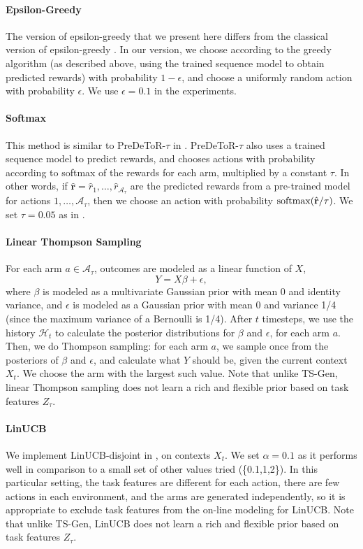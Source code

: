 \paragraph{Epsilon-Greedy}
The version of epsilon-greedy that we present here differs from the classical version of epsilon-greedy \citep{sutton2018reinforcement}. In our version, we choose according to the greedy algorithm (as described above, using the trained sequence model to obtain predicted rewards) with probability $1-\epsilon$, and choose a uniformly random action with probability $\epsilon$. We use $\epsilon=0.1$ in the experiments. 

\paragraph{Softmax}
This method is similar to PreDeToR-$\tau$ in \citet{mukherjee2024pretraining}. PreDeToR-$\tau$ also uses a trained sequence model to predict rewards, and chooses actions with probability 
according to softmax of the rewards for each arm, multiplied by a constant $\tau$. 
In other words, if $\hat {\textbf {r}}=\hat r_1,\ldots,\hat r_{\mathcal A_{\tau}}$ are the predicted rewards from a pre-trained model for actions $1,\ldots,\mathcal A_{\tau}$, then we choose an action with probability 
$\textrm{softmax}( \hat{\textbf r}/\tau)$. 
We set $\tau=0.05$ as in \citet{mukherjee2024pretraining}.

\paragraph{Linear Thompson Sampling}
For each arm $a\in\mathcal A_{\tau}$, outcomes are modeled as a linear function of $X$,
$$Y=X\beta + \epsilon,$$
where $\beta$ is modeled as a multivariate Gaussian prior with mean 0 and identity variance, and $\epsilon$ is modeled as a Gaussian prior with mean 0 and variance 1/4 (since the maximum variance of a Bernoulli is 1/4). 
After $t$ timesteps, we use the history $\mathcal H_t$ to calculate the posterior distributions for $\beta$ and $\epsilon$, for each arm $a$. 
Then, we do Thompson sampling: for each arm $a$, we sample once from the posteriors of $\beta$ and $\epsilon$, and calculate what $Y$ should be, given the current context $X_t$. We choose the arm with the largest such value. 
Note that unlike TS-Gen, linear Thompson sampling does not learn a rich and flexible prior based on task features $Z_\tau$. 

\paragraph{LinUCB}
We implement LinUCB-disjoint in \citep{li2010contextual}, on contexts $X_t$. We set $\alpha=0.1$ as it performs well in comparison to a small set of other values tried (\{0.1,1,2\}). 
In this particular setting, the task features are different for each action, there are few actions in each environment, and the arms are generated independently, so it is appropriate to exclude task features from the on-line modeling for LinUCB. 
Note that unlike TS-Gen, LinUCB does not learn a rich and flexible prior based on task features $Z_\tau$. 


